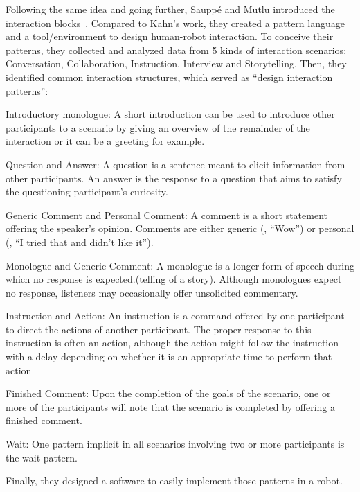\documentclass[a4paper,11pt,twoside]{StyleThese}
\begin{document}
Following the same idea and going further, Sauppé and Mutlu introduced the interaction blocks~\cite{sauppe_2014_design}. Compared to Kahn’s work, they created a pattern language and a tool/environment to design human-robot interaction. To conceive their patterns, they collected and analyzed data from 5 kinds of interaction scenarios: Conversation, Collaboration, Instruction, Interview and Storytelling.
Then, they identified common interaction structures, which served as ``design interaction patterns'':
\begin{bulletList}
	\item Introductory monologue: A short introduction can be used to introduce other participants to a scenario by giving an overview of the remainder of the interaction or it can be a greeting for example.
	\item Question and Answer: A question is a sentence meant to elicit information from other participants. An answer is the response to a question that aims to satisfy the questioning participant’s curiosity.
	\item Generic Comment and Personal Comment: A comment is a short statement offering the speaker’s opinion. Comments are either generic (\eg, ``Wow'') or personal (\eg, ``I tried that and didn’t like it'').
	\item Monologue and Generic Comment: A monologue is a longer form of speech during which no response is expected.(\eg telling of a story). Although monologues expect no response, listeners may occasionally offer unsolicited commentary.
	\item Instruction and Action: An instruction is a command offered by one participant to direct the actions of another participant. The proper response to this instruction is often an action, although the action might follow the instruction with a delay depending on whether it is an appropriate time to perform that action
	\item Finished Comment: Upon the completion of the goals of the scenario, one or more of the participants will note that the scenario is completed by offering a finished comment.
	\item Wait: One pattern implicit in all scenarios involving two or more participants is the wait pattern.
\end{bulletList}
Finally, they designed a software to easily implement those patterns in a robot.
\end{document}
